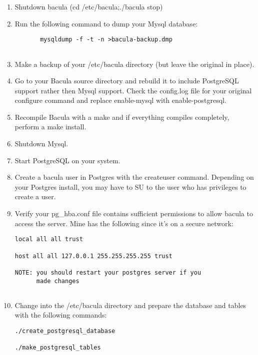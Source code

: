\begin{enumerate}
\item Shutdown bacula (cd /etc/bacula;./bacula stop)  
\item Run the following command to dump your Mysql database:  

   \footnotesize
\begin{verbatim}
       mysqldump -f -t -n >bacula-backup.dmp
    
\end{verbatim}
\normalsize

\item Make a backup of your /etc/bacula directory (but leave the  original in
   place).  
\item Go to your Bacula source directory and rebuild it to include  PostgreSQL
   support rather then Mysql support. Check the  config.log file for your
   original configure command and replace  enable-mysql with enable-postgresql.  
\item Recompile Bacula with a make and if everything compiles  completely,
   perform a make install.  
\item Shutdown Mysql. 
\item Start PostgreSQL on your system.  
\item Create a bacula user in Postgres with the createuser command.  Depending on
   your Postgres install, you may have to SU to the  user who has privileges to
   create a user.  
\item Verify your pg\_hba.conf file contains sufficient permissions to  allow
   bacula to access the server. Mine has the following since  it's on a secure
   network:  

\footnotesize
\begin{verbatim}
local all all trust
                
host all all 127.0.0.1 255.255.255.255 trust
                
NOTE: you should restart your postgres server if you
      made changes
      
\end{verbatim}
\normalsize

\item Change into the /etc/bacula directory and prepare the database  and
   tables with the following commands:  

\footnotesize
\begin{verbatim}
./create_postgresql_database
                                
./make_postgresql_tables
                                

\end{verbatim}
\end{enumerate}
